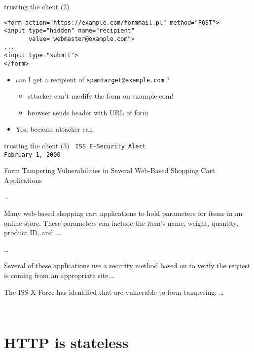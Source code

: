 \begin{frame}[fragile,label=trustCli2]{trusting the client (2)}
\begin{verbatim}
<form action="https://example.com/formmail.pl" method="POST">
<input type="hidden" name="recipient"
       value="webmaster@example.com">
...
<input type="submit">
</form>
\end{verbatim}
    \begin{itemize}
    \item can I get a recipient of \texttt{spamtarget@example.com} ?
        \begin{itemize}
        \item attacker can't modify the form on example.com!
        \item browser sends header with URL of form
        \end{itemize}
    \item<2> Yes, because attacker can 
    \end{itemize}
\end{frame}

\begin{frame}[fragile,label=trustCliNoOne]{trusting the client (3)}
\setlength{\parskip}{0em}
\fontsize{10}{11}\selectfont\tt
ISS E-Security Alert  \\
February 1, 2000 

Form Tampering Vulnerabilities in Several Web-Based Shopping Cart Applications

\ldots

Many web-based shopping cart applications  to
hold parameters for items in an online store. These parameters can include
the item's name, weight, quantity, product ID, and .\ldots

\ldots

Several of these applications use a security method based on 
to verify the request is coming from an appropriate site.\ldots

The ISS X-Force has identified  that are vulnerable to form tampering. \ldots

~
\end{frame}


\section{HTTP is stateless}

